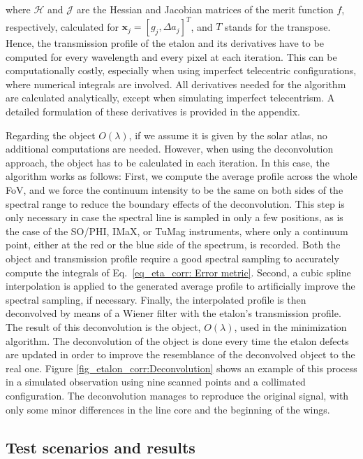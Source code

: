 where $\mathcal{H}$ and $\mathcal{J}$ are the Hessian and Jacobian matrices of the merit function $f$, respectively, calculated for $\mathbf{x}_j = [g_j,\Delta a_j]^T$, and $T$ stands for the transpose. Hence, the transmission profile of the etalon and its derivatives have to be computed for every wavelength and every pixel at each iteration. This can be computationally costly, especially when using imperfect telecentric configurations, where numerical integrals are involved. All derivatives needed for the algorithm are calculated analytically, except when simulating imperfect telecentrism. A detailed formulation of these derivatives is provided in the appendix.

Regarding the object $O(\lambda)$, if we assume it is given by the solar atlas, no additional computations are needed. However, when using the deconvolution approach, the object has to be calculated in each iteration. In this case, the algorithm works as follows: First, we compute the average profile across the whole FoV, and we force the continuum intensity to be the same on both sides of the spectral range to reduce the boundary effects of the deconvolution. This step is only necessary in case the spectral line is sampled in only a few positions, as is the case of the SO/PHI, IMaX, or TuMag instruments, where only a continuum point, either at the red or the blue side of the spectrum, is recorded. Both the object and transmission profile require a good spectral sampling to accurately compute the integrals of Eq.~\eqref{eq_eta_corr: Error metric}. Second, a cubic spline interpolation is applied to the generated average profile to artificially improve the spectral sampling, if necessary. Finally, the interpolated profile is then deconvolved by means of a Wiener filter with the etalon's transmission profile. The result of this deconvolution is the object, $O(\lambda)$, used in the minimization algorithm. The deconvolution of the object is done every time the etalon defects are updated in order to improve the resemblance of the deconvolved object to the real one. Figure \ref{fig_etalon_corr:Deconvolution} shows an example of this process in a simulated observation using nine scanned points and a collimated configuration. The deconvolution manages to reproduce the original signal, with only some minor differences in the line core and the beginning of the wings.

\subsection{\label{eta_corr_susec: results}Test scenarios and results}

